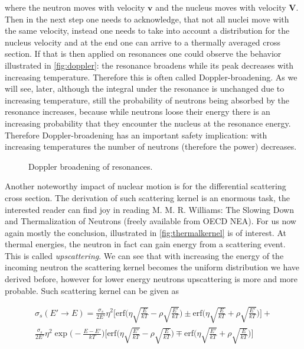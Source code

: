 \noindent where the neutron moves with velocity $\textbf{v}$ and the nucleus moves with velocity $\textbf{V}$. Then in the next step one needs to acknowledge, that not all nuclei move with the same velocity, instead one needs to take into account a distribution for the nucleus velocity and at the end one can arrive to a thermally averaged cross section. If that is then applied on  resonances one could observe the behavior illustrated in \autoref{fig:doppler}: the resonance broadens while its peak decreases with increasing temperature. Therefore this is often called Doppler-broadening. As we will see, later, although the integral under the resonance is unchanged due to increasing temperature, still the probability of neutrons being absorbed by the resonance increases, because while neutrons loose their energy there is an increasing probability that they encounter the nucleus at the resonance energy. Therefore Doppler-broadening has an important safety implication: with increasing temperatures the number of neutrons (therefore the power) decreases.

\begin{figure}[ht!]
\protect {}\protect
\caption{\label{fig:doppler} \footnotesize{Doppler broadening of resonances.}}
\end{figure}

Another noteworthy impact of nuclear motion is for the differential scattering cross section. The derivation of such scattering kernel is an enormous task, the interested reader can find joy in reading M. M. R. Williams:  The Slowing Down and Thermalization of Neutrons (freely available from OECD NEA). For us now again mostly the conclusion, illustrated in \autoref{fig:thermalkernel} is of interest. At thermal energies, the neutron in fact can gain energy from a scattering event. This is called \textit{upscattering}. We can see that with increasing the energy of the incoming neutron the scattering kernel becomes the uniform distribution we have derived before, however for lower energy neutrons upscattering is more and more probable. Such scattering kernel can be given as


\begin{equation}
\begin{aligned}
\sigma_s(E'\rightarrow E)=\frac{\sigma_s}{2E'}\eta^2\Bigg[\text{erf}\Bigg(\eta\sqrt{\frac{E}{kT}}-\rho\sqrt{\frac{E'}{kT}}\Bigg)\pm \text{erf}\Bigg(\eta\sqrt{\frac{E}{kT}}+\rho\sqrt{\frac{E'}{kT}}\Bigg)\Bigg]+ \\ \frac{\sigma_s}{2E'}\eta^2\exp\Bigg(-\frac{E-E'}{kT}\Bigg)\Bigg[\text{erf}\Bigg(\eta\sqrt{\frac{E'}{kT}}-\rho\sqrt{\frac{E}{kT}}\Bigg)\mp \text{erf}\Bigg(\eta\sqrt{\frac{E'}{kT}}+\rho\sqrt{\frac{E}{kT}}\Bigg)\Bigg]
\end{aligned}
\end{equation}

